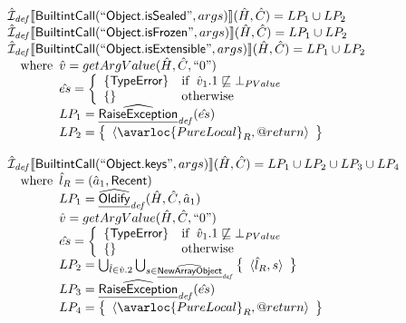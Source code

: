 \[
\begin{array}{l}
\aI_{\it def}\lbr \SF{BuiltintCall}(``\SF{Object.isSealed}",args)\rbr(\hat{H},\hat{C}) = LP_1 \cup LP_2\\
\aI_{\it def}\lbr \SF{BuiltintCall}(``\SF{Object.isFrozen}",args)\rbr(\hat{H},\hat{C}) = LP_1 \cup LP_2\\
\aI_{\it def}\lbr \SF{BuiltintCall}(``\SF{Object.isExtensible}",args)\rbr(\hat{H},\hat{C}) = LP_1 \cup LP_2\\
\quad\wherec{
  \hat{v} = getArgValue(\hat{H}, \hat{C}, ``0")\\
  \hat{es} = \left\{\begin{array}{ll}
      \{ \SF{TypeError} \}
      & \ifc{\hat{v}_1.1 \not\sqsubseteq \bot_{PValue}}\\
      \set{} & \owc
    \end{array}\right.\\
  LP_1 = \ahf{RaiseException}_{\it def}(\hat{es})\\ 
  LP_2 = \set{\langle\avarloc{PureLocal}_R,\varprop{return}\rangle}\\
  }\\
\\

\aI_{\it def}\lbr \SF{BuiltintCall}(``\SF{Object.keys}",args)\rbr(\hat{H},\hat{C}) = LP_1 \cup LP_2 \cup LP_3 \cup LP_4\\
\quad\wherec{
  \hat{l}_R = (\hat{a}_1, \SF{Recent})\\
  LP_1 = \ahf{Oldify}_{\it def}(\hat{H}, \hat{C}, \hat{a}_1)\\
  \hat{v} = getArgValue(\hat{H}, \hat{C}, ``0")\\
  \hat{es} = \left\{\begin{array}{ll}
      \{ \SF{TypeError} \}
      & \ifc{\hat{v}_1.1 \not\sqsubseteq \bot_{PValue}}\\
      \set{} & \owc
    \end{array}\right.\\
  LP_2 = \bigcup_{\hat{l} \in \hat{v}.2}\bigcup_{s \in \ahf{NewArrayObject}_{\it def}}
    \set{\langle \hat{l}_R, s\rangle}\\
  LP_3 = \ahf{RaiseException}_{\it def}(\hat{es})\\ 
  LP_4 = \set{\langle\avarloc{PureLocal}_R,\varprop{return}\rangle}\\
  }\\
\\



\end{array}\]
